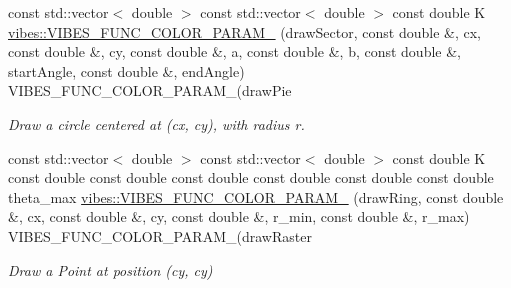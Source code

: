 \begin{DoxyCompactItemize}
const std\+::vector$<$ double $>$ const std\+::vector$<$ double $>$ const double K \hyperlink{group__drawing_gabc42f6a4ac88539dfba5ca2a06dd38bb}{vibes\+::\+V\+I\+B\+E\+S\+\_\+\+F\+U\+N\+C\+\_\+\+C\+O\+L\+O\+R\+\_\+\+P\+A\+R\+A\+M\+\_} (draw\+Sector, const double \&, cx, const double \&, cy, const double \&, a, const double \&, b, const double \&, start\+Angle, const double \&, end\+Angle) V\+I\+B\+E\+S\+\_\+\+F\+U\+N\+C\+\_\+\+C\+O\+L\+O\+R\+\_\+\+P\+A\+R\+A\+M\+\_(draw\+Pie
\begin{DoxyCompactList}\small\item\em Draw a circle centered at ({\itshape cx}, {\itshape cy}), with radius {\itshape r}. \end{DoxyCompactList}\item 
const std\+::vector$<$ double $>$ const std\+::vector$<$ double $>$ const double K const double const double const double const double const double const double theta\+\_\+max \hyperlink{group__drawing_ga60266299e74aa49b8633e013deaab601}{vibes\+::\+V\+I\+B\+E\+S\+\_\+\+F\+U\+N\+C\+\_\+\+C\+O\+L\+O\+R\+\_\+\+P\+A\+R\+A\+M\+\_} (draw\+Ring, const double \&, cx, const double \&, cy, const double \&, r\+\_\+min, const double \&, r\+\_\+max) V\+I\+B\+E\+S\+\_\+\+F\+U\+N\+C\+\_\+\+C\+O\+L\+O\+R\+\_\+\+P\+A\+R\+A\+M\+\_(draw\+Raster
\begin{DoxyCompactList}\small\item\em Draw a Point at position (cy, cy) \end{DoxyCompactList}\end{DoxyCompactItemize}
